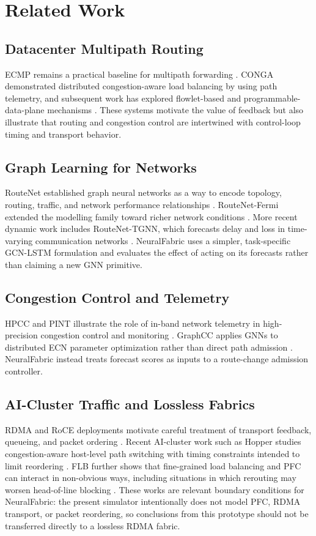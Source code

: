 \documentclass[conference]{IEEEtran}
\begin{document}
\section{Related Work}
\subsection{Datacenter Multipath Routing}
ECMP remains a practical baseline for multipath forwarding \cite{hopps2000}. CONGA demonstrated distributed congestion-aware load balancing by using path telemetry, and subsequent work has explored flowlet-based and programmable-data-plane mechanisms \cite{alizadeh2014conga,katta2016hula}. These systems motivate the value of feedback but also illustrate that routing and congestion control are intertwined with control-loop timing and transport behavior.

\subsection{Graph Learning for Networks}
RouteNet established graph neural networks as a way to encode topology, routing, traffic, and network performance relationships \cite{rusek2020routenet}. RouteNet-Fermi extended the modelling family toward richer network conditions \cite{ferriol2023routnetfermi}. More recent dynamic work includes RouteNet-TGNN, which forecasts delay and loss in time-varying communication networks \cite{ahmad2026routnettg}. NeuralFabric uses a simpler, task-specific GCN-LSTM formulation and evaluates the effect of acting on its forecasts rather than claiming a new GNN primitive.

\subsection{Congestion Control and Telemetry}
HPCC and PINT illustrate the role of in-band network telemetry in high-precision congestion control and monitoring \cite{li2019hpcc,benbasat2020pint}. GraphCC applies GNNs to distributed ECN parameter optimization rather than direct path admission \cite{bernardez2025graphcc}. NeuralFabric instead treats forecast scores as inputs to a route-change admission controller.

\subsection{AI-Cluster Traffic and Lossless Fabrics}
RDMA and RoCE deployments motivate careful treatment of transport feedback, queueing, and packet ordering \cite{zhu2015dcqcn}. Recent AI-cluster work such as Hopper studies congestion-aware host-level path switching with timing constraints intended to limit reordering \cite{hopper2025}. FLB further shows that fine-grained load balancing and PFC can interact in non-obvious ways, including situations in which rerouting may worsen head-of-line blocking \cite{hu2025flb}. These works are relevant boundary conditions for NeuralFabric: the present simulator intentionally does not model PFC, RDMA transport, or packet reordering, so conclusions from this prototype should not be transferred directly to a lossless RDMA fabric.
\end{document}
